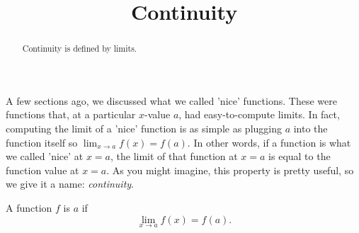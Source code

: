 \documentclass{ximera}
\title[Dig-In:]{Continuity}
\begin{document}
\begin{abstract}
Continuity is defined by limits. 
\end{abstract}
\maketitle

A few sections ago, we discussed what we called 'nice' functions.  These were functions that, at a particular $x$-value $a$, had easy-to-compute limits.  In fact, computing the limit of a 'nice' function is as simple as plugging $a$ into the function itself so $ \lim_{x\to a} f(x) = f(a).$
In other words, if a function is what we called 'nice' at $x=a$, the limit of that function at $x=a$ is equal to the function value at $x=a$.  As you might imagine, this property is pretty useful, so we give it a name: \textit{continuity}. 

\begin{definition}
  A function $f$ is  $a$ if
  \[
  \lim_{x\to a}f(x) = f(a).
  \]
\end{definition}
\end{document}
